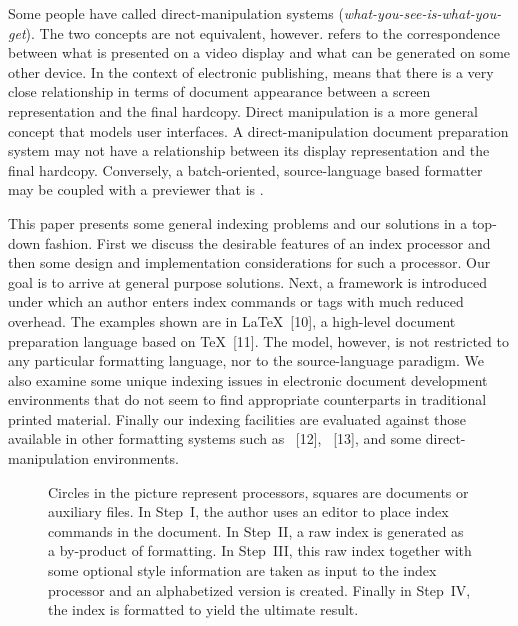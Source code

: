 Some people have called direct-manipulation systems {\W}
({\it what-you-see-is-what-you-get\/}).
The two concepts are not equivalent, however.
{\W} refers to the correspondence between what is presented on a video display
and what can be generated on some other device.  In the context of
electronic publishing, {\W} means that there is a very close relationship
in terms of document appearance
between a screen representation and the final hardcopy.
Direct manipulation is a more general concept that models user interfaces.
A direct-manipulation document preparation system may not have
a {\W} relationship between its display representation and the final hardcopy.
Conversely, a batch-oriented, source-language based formatter 
may be coupled with a previewer that is {\W}.

This paper presents some general indexing problems and our solutions 
in a top-down fashion.
First we discuss the desirable features of an index processor
and then some design and implementation considerations for such a processor.
Our goal is to arrive at general purpose solutions.
Next, a framework is introduced under which an author enters index commands
or tags with much reduced overhead.
The examples shown are in {\LaTeX}~[10], a high-level
document preparation language based on {\TeX}~[11].
The model, however, is not restricted to any particular formatting language,
nor to the source-language paradigm.
We also examine some unique indexing issues in
electronic document development environments that do not seem to find
appropriate counterparts in traditional printed material.
Finally our indexing facilities are evaluated against those available in
other formatting systems such as {\SB}~[12],
{\TF}~[13], and some direct-manipulation environments.

\begin{figure}[p]
\centerline{
}
\caption[{\it The sequential flow of index processing\/}.]{Circles
in the picture represent processors,
squares are documents or auxiliary files.  In Step~I, the author uses an
editor to place index commands in the document.  In Step~II, a raw index
is generated as a by-product of formatting.  In Step~III, this raw index
together with some optional style information are taken as input to
the index processor and an alphabetized version is created. 
Finally in Step~IV, the index is formatted to yield the ultimate result.}
\end{figure}

